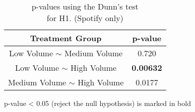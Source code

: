 \begin{table}[t]
\centering
\caption{\centering p-values using the Dunn’s test \protect\\for H1. (Spotify only)}
\begin{threeparttable}
\label{table1}
\begin{tabular}{|c|c|}
\hline
\textbf{Treatment Group} & \textbf{p-value}\\
\hline

Low Volume $\sim$ Medium Volume
&0.720

\\ 
\hline

Low Volume $\sim$ High Volume
&\textbf{0.00632}

\\
\hline

Medium Volume $\sim$ High Volume
&0.0177

 \\
\hline

\end{tabular}
\label{table_MAP}
 \begin{tablenotes}
        \footnotesize
        \item * p-value < 0.05 (\ie reject the null hypothesis) is marked in bold 
      \end{tablenotes}
  \end{threeparttable}
\end{table}

